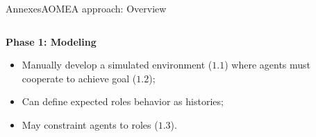 \begin{frame}{Annexes}{AOMEA approach: Overview}

    \begin{columns}

        \begin{column}{0.6\textwidth}

            \textbf{Phase 1: Modeling}

            \begin{itemize}
                \item Manually develop a simulated environment ($1.1$) where agents must cooperate to achieve goal ($1.2$);
                \item Can define expected roles behavior as histories;
                \item May constraint agents to roles ($1.3$).
            \end{itemize}

        \end{column}

        \begin{column}{0.4\textwidth}
            \centering
        \end{column}


\end{columns}
\end{frame}
